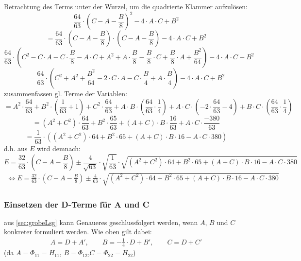 \documentclass[12pt,a4paper]{article}
\begin{document}
  Betrachtung des Terms unter der Wurzel, um die quadrierte Klammer aufzulösen:   
$$ \frac{64}{63}\cdot \left( C-A - \frac{B}{8}\right) ^2 - 4 \cdot  A\cdot C + B^2 $$
$$= \frac{64}{63}\cdot \left( C-A - \frac{B}{8}\right)\cdot \left( C-A - \frac{B}{8}\right) - 4 \cdot  A\cdot C + B^2 $$
$$ \frac{64}{63}\cdot \left( 
C ^2 - C \cdot A - C \cdot \frac{B}{8}
- A \cdot C + A ^2 + A \cdot \frac{B}{8}
- \frac{B}{8}\cdot C + \frac{B}{8}\cdot A + \frac{B^ 2}{64} 
\right) - 4 \cdot  A\cdot C + B^2 $$
$$= \frac{64}{63}\cdot \left( 
C ^2 + A ^2 + \frac{B^ 2}{64} 
- 2\cdot C \cdot A - C \cdot \frac{B}{4}
 + A \cdot \frac{B}{4}
\right) - 4 \cdot  A\cdot C + B^2 $$
zusammenfassen gl. Terme der Variablen:
$$= A^2 \cdot \frac{64}{63} 
+ B^2 \cdot \left( \frac{1}{63} + 1\right) + C ^2 \cdot \frac{64}{63} 
+ A\cdot B \cdot \left(   \frac{64}{63} \cdot \frac{1}{4}\right) 
 + A\cdot C \cdot\left( -2 \cdot \frac{64}{63} - 4 \right) 
 + B\cdot C \cdot \left(   \frac{64}{63} \cdot \frac{1}{4}\right) 
$$
$$= \left( A^2 + C ^2\right)\cdot \frac{64}{63} 
+ B^2 \cdot \frac{65}{63} 
+ \left( A+C\right) \cdot B \cdot\frac{16}{63} 
 + A\cdot C \cdot \frac{-380}{63} 
$$
$$= 
\frac{1}{63} \cdot \left(
\left( A^2 + C ^2\right)\cdot 64
+ B^2 \cdot 65 
+ \left( A+C\right) \cdot B \cdot 16
 - A\cdot C \cdot 380
 \right) 
$$
d.h. aus $E$ wird demnach: 
$$ E = \frac{32}{63}\cdot \left( C-A - \frac{B}{8}\right) \pm 
    \frac{4}{\sqrt{63} }
  \cdot 
  \sqrt{\frac{1}{63}}\cdot 
  \sqrt{
     \left( A^2 + C ^2\right)\cdot 64
+ B^2 \cdot 65 
+ \left( A+C\right) \cdot B \cdot 16
 - A\cdot C \cdot 380
 }$$
 \begin{gather} \label{eq:E_ABC}
  \Leftrightarrow E = \frac{32}{63}\cdot \left( C-A - \frac{B}{8}\right) \pm 
    \frac{4}{63}
  \cdot 
  \sqrt{
     \left( A^2 + C ^2\right)\cdot 64
+ B^2 \cdot 65 
+ \left( A+C\right) \cdot B \cdot 16
 - A\cdot C \cdot 380
 }
 \end{gather}


\subsubsection{Einsetzen der D-Terme für A und C} \label{sec:einsetzenAC}
aus \ref{sec:grobeLsg} kann Genaueres geschlussfolgert werden, wenn $A$, $B$ und $C$ konkreter formuliert werden. Wie oben gilt dabei: 
\begin{gather}
\label{eq:ABC_strich}
 A= D+A' , \qquad B = - \frac{1}{4} \cdot D + B', \qquad C = D+C'
 \end{gather}
(da  $A = \Phi_{11} = H_{11}$, $B = \Phi_{12}$,$C = \Phi_{22} = H_{22}$)
\end{document}
